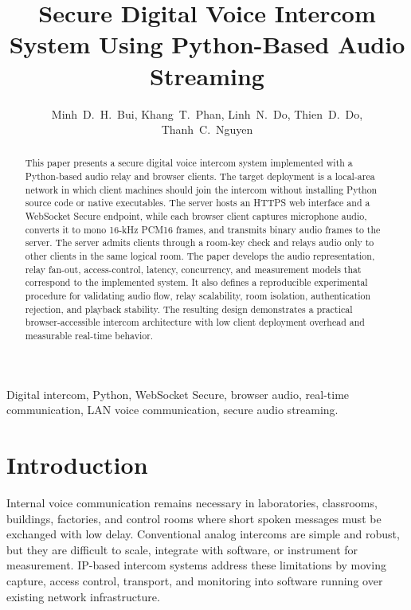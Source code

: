 \documentclass[conference]{IEEEtran}
\begin{document}
\title{Secure Digital Voice Intercom System Using Python-Based Audio Streaming}

\author{Minh~D.~H.~Bui,
        Khang~T.~Phan,
        Linh~N.~Do,
        Thien~D.~Do,
        Thanh~C.~Nguyen\\
}

\maketitle

\begin{abstract}
This paper presents a secure digital voice intercom system implemented with a Python-based audio relay and browser clients. The target deployment is a local-area network in which client machines should join the intercom without installing Python source code or native executables. The server hosts an HTTPS web interface and a WebSocket Secure endpoint, while each browser client captures microphone audio, converts it to mono 16-kHz PCM16 frames, and transmits binary audio frames to the server. The server admits clients through a room-key check and relays audio only to other clients in the same logical room. The paper develops the audio representation, relay fan-out, access-control, latency, concurrency, and measurement models that correspond to the implemented system. It also defines a reproducible experimental procedure for validating audio flow, relay scalability, room isolation, authentication rejection, and playback stability. The resulting design demonstrates a practical browser-accessible intercom architecture with low client deployment overhead and measurable real-time behavior.
\end{abstract}

\begin{IEEEkeywords}
Digital intercom, Python, WebSocket Secure, browser audio, real-time communication, LAN voice communication, secure audio streaming.
\end{IEEEkeywords}

\section{Introduction}

Internal voice communication remains necessary in laboratories, classrooms, buildings, factories, and control rooms where short spoken messages must be exchanged with low delay. Conventional analog intercoms are simple and robust, but they are difficult to scale, integrate with software, or instrument for measurement. IP-based intercom systems address these limitations by moving capture, access control, transport, and monitoring into software running over existing network infrastructure.
\end{document}
